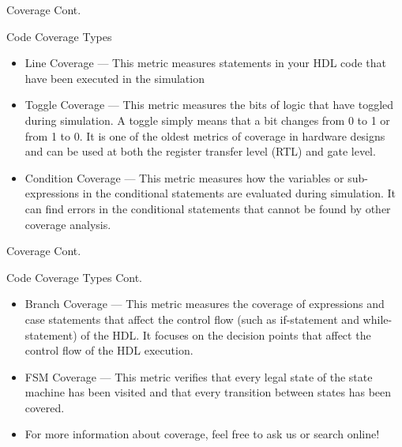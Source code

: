 \documentclass[dvipsnames]{beamer}
\begin{document}
\begin{frame}{Coverage Cont.}
    \begin{block}{Code Coverage Types}
        \begin{itemize}
            \item Line Coverage — This metric measures statements in your HDL code that have been executed in the simulation
            \item Toggle Coverage — This metric measures the bits of logic that have toggled during simulation. A toggle simply means that a bit changes from 0 to 1 or from 1 to 0. It is one of the oldest metrics of coverage in hardware designs and can be used at both the register transfer level (RTL) and gate level.
            \item Condition Coverage — This metric measures how the variables or sub-expressions in the conditional statements are evaluated during simulation. It can find errors in the conditional statements that cannot be found by other coverage analysis.
        \end{itemize}
    \end{block}
\end{frame}
\begin{frame}{Coverage Cont.}
    \begin{block}{Code Coverage Types Cont.}
        \begin{itemize}
            \item Branch Coverage — This metric measures the coverage of expressions and case statements that affect the control flow (such as if-statement and while-statement) of the HDL. It focuses on the decision points that affect the control flow of the HDL execution.
            \item FSM Coverage — This metric verifies that every legal state of the state machine has been visited and that every transition between states has been covered.
            \item For more information about coverage, feel free to ask us or search online!
        \end{itemize}
    \end{block}
\end{frame}
\end{document}
